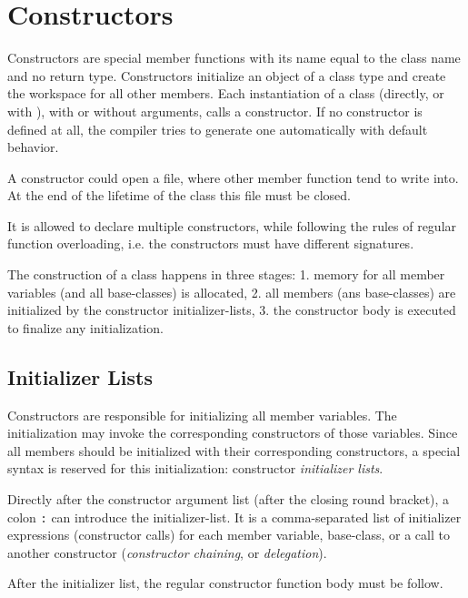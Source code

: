 \section{Constructors\label{sec:constructor}}
Constructors are special member functions with its name equal to the class name and no return type. Constructors initialize an object of a class type
and create the workspace for all other members. Each instantiation of a class (directly, or with ), with or without arguments, calls a constructor.
If no constructor is defined at all, the compiler tries to generate one automatically with default behavior.

\begin{example}
  A constructor could open a file, where other member function tend to write into. At the end of the lifetime of the class this file must be closed.
\end{example}

It is allowed to declare multiple constructors, while following the rules of regular function overloading, i.e. the constructors must have different signatures.

The construction of a class happens in three stages: 1. memory for all member variables (and all base-classes) is allocated, 2. all members (ans base-classes) are
initialized by the constructor initializer-lists, 3. the constructor body is executed to finalize any initialization.

\subsection{Initializer Lists}
Constructors are responsible for initializing all member variables. The initialization may invoke the corresponding constructors of those variables. Since all
members should be initialized with their corresponding constructors, a special syntax is reserved for this initialization: constructor \emph{initializer lists}.

Directly after the constructor argument list (after the closing round bracket), a colon \texttt{:} can introduce the initializer-list. It is a comma-separated
list of initializer expressions (constructor calls) for each member variable, base-class, or a call to another constructor (\emph{constructor chaining}, or
\emph{delegation}).

After the initializer list, the regular constructor function body must be follow.

